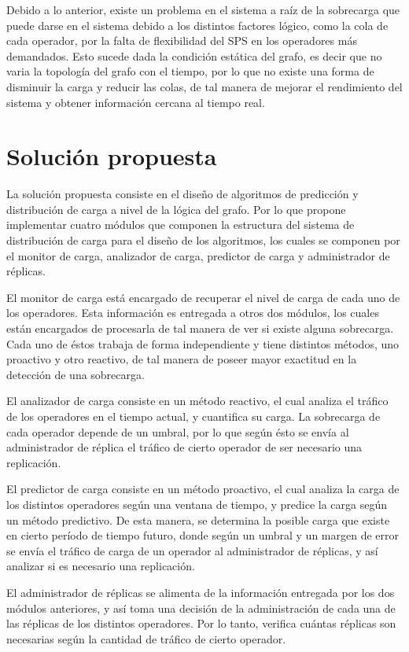 Debido a lo anterior, existe un problema en el sistema a raíz de la sobrecarga que puede darse en el sistema debido a los distintos factores lógico, como la cola de cada operador, por la falta de flexibilidad del SPS en los operadores más demandados. Esto sucede dada la condición estática del grafo, es decir que no varia la topología del grafo con el tiempo, por lo que no existe una forma de disminuir la carga y reducir las colas, de tal manera de mejorar el rendimiento del sistema y obtener información cercana al tiempo real.

\section{Solución propuesta}
\label{intro:solucion}

La solución propuesta consiste en el dise\~no de algoritmos de predicci\'on y distribuci\'on de carga a nivel de la l\'ogica del grafo. Por lo que propone implementar cuatro módulos que componen la estructura del sistema de distribución de carga para el dise\~no de los algoritmos, los cuales se componen por el monitor de carga, analizador de carga, predictor de carga y administrador de réplicas.

El monitor de carga está encargado de recuperar el nivel de carga de cada uno de los operadores. Esta información es entregada a otros dos módulos, los cuales están encargados de procesarla de tal manera de ver si existe alguna sobrecarga. Cada uno de éstos trabaja de forma independiente y tiene distintos métodos, uno proactivo y otro reactivo, de tal manera de poseer mayor exactitud en la detección de una sobrecarga.

El analizador de carga consiste en un método reactivo, el cual analiza el tráfico de los operadores en el tiempo actual, y cuantifica su carga. La sobrecarga de cada operador depende de un umbral, por lo que según ésto se envía al administrador de réplica el tráfico de cierto operador de ser necesario una replicación.

El predictor de carga consiste en un método proactivo, el cual analiza la carga de los distintos operadores según una ventana de tiempo, y predice la carga según un método predictivo. De esta manera, se determina la posible carga que existe en cierto período de tiempo futuro, donde según un umbral y un margen de error se envía el tráfico de carga de un operador al administrador de réplicas, y así analizar si es necesario una replicación.

El administrador de réplicas se alimenta de la información entregada por los dos módulos anteriores, y así toma una decisión de la administración de cada una de las réplicas de los distintos operadores. Por lo tanto, verifica cuántas réplicas son necesarias según la cantidad de tráfico de cierto operador.

